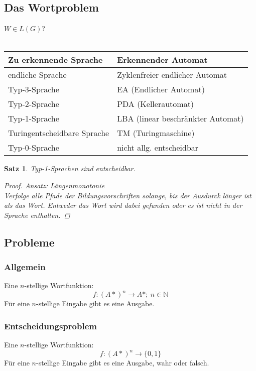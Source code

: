 \documentclass{article}
\begin{document}
\subsection{Das Wortproblem}
\Rightarrow $W\in L(G)$?\\\\
\begin{tabular}{l | l}
    Zu erkennende Sprache       & Erkennender Automat               \\\hline
    endliche Sprache            & Zyklenfreier endlicher Automat    \\
    Typ-3-Sprache               & EA (Endlicher Automat)            \\
    Typ-2-Sprache               & PDA (Kellerautomat)               \\
    Typ-1-Sprache               & LBA (linear beschränkter Automat) \\
    Turingentscheidbare Sprache & TM (Turingmaschine)               \\\hline
    Typ-0-Sprache               & nicht allg. entscheidbar
\end{tabular}
\begin{framed}
\newtheorem{Typ-1-Entscheidbarkeit}{Satz}
\begin{Typ-1-Entscheidbarkeit}
Typ-1-Sprachen sind entscheidbar.
\begin{proof}
    Ansatz: Längenmonotonie\\
    Verfolge alle Pfade der Bildungsvorschriften solange, bis der Ausdurck länger ist als das Wort. Entweder das Wort wird dabei gefunden oder es ist nicht in der Sprache enthalten. \qedhere
\end{proof}
\end{Typ-1-Entscheidbarkeit}
\end{framed}
\subsection{Probleme}
\subsubsection{Allgemein}
Eine $n$-stellige Wortfunktion:
\begin{equation}
    f: \left(A*\right)^n \rightarrow A*; \: n \in \mathbb{N}
\end{equation}
F\"ur eine $n$-stellige Eingabe gibt es eine Ausgabe.
\subsubsection{Entscheidungsproblem}
Eine $n$-stellige Wortfunktion:
\begin{equation}
    f: \left(A*\right)^n \rightarrow\{0, 1\}
\end{equation}
F\"ur eine $n$-stellige Eingabe gibt es eine Ausgabe, wahr oder falsch.
\end{document}
